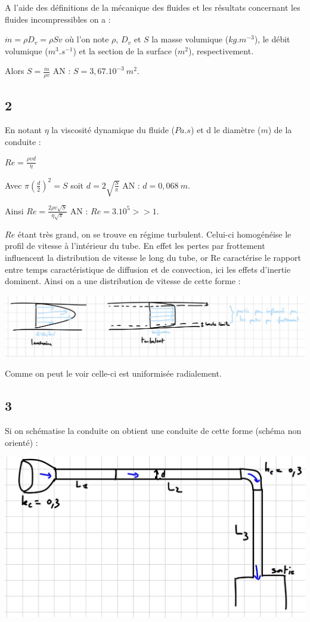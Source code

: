 \documentclass[12pt]{article}
\begin{document}
A l'aide des définitions de la mécanique des fluides et les résultats concernant les fluides incompressibles on a :

$\dot m = \rho D_v = \rho S v$ où l'on note $\rho$, $D_v$ et $S$ la masse volumique ($kg.m^{-3}$), le débit volumique ($m^3.s^{-1}$) et la section de la surface ($m^2$), respectivement.

Alors $\boxed{S = \frac {\dot m}{\rho v}}$ AN : $S=3,67.10^{-3} \ m^2$.

\subsection*{2}
En notant $\eta$ la viscosité dynamique du fluide ($Pa.s$) et d le diamètre ($m$) de la conduite :

$Re=\frac{\rho v d}{\eta}$

Avec $\pi (\frac{d}{2})^2=S$ soit $\boxed{d=2 \sqrt {\frac{S}{\pi}}}$ AN : $d=0,068 \ m$.

Ainsi $\boxed{Re = \frac{2 \rho v \sqrt{S}}{\eta \sqrt{\pi}}}$ AN : $Re = 3.10^5 >> 1$.

$Re$ étant très grand, on se trouve en régime turbulent. Celui-ci homogénéise le profil de vitesse à l'intérieur du tube. En effet les pertes par frottement influencent la distribution de vitesse le long du tube, or Re caractérise le rapport entre temps caractéristique de diffusion et de convection, ici les effets d'inertie dominent. Ainsi on a une distribution de vitesse de cette forme : 

\includegraphics[scale=0.25]{1 image.jpg}

Comme on peut le voir celle-ci est uniformisée radialement. 

\subsection*{3}
Si on schématise la conduite on obtient une conduite de cette forme (schéma non orienté) :

\includegraphics[scale=0.4]{3 image.jpg}
\end{document}
